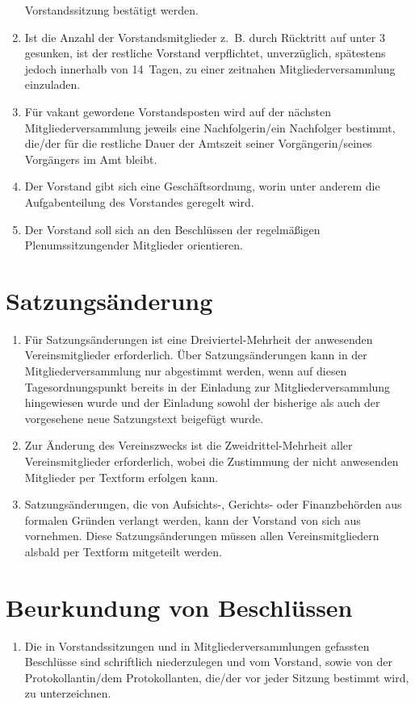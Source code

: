\documentclass[a4paper,12pt]{scrartcl}
\begin{document}
\begin{enumerate}
    Vorstandssitzung bestätigt werden. 
  \item Ist die Anzahl der Vorstandsmitglieder z.~B. durch Rücktritt auf unter 3
    gesunken, ist der restliche Vorstand verpflichtet, unverzüglich, spätestens
    jedoch innerhalb von 14~Tagen, zu einer zeitnahen Mitgliederversammlung
    einzuladen.
  \item Für vakant gewordene Vorstandsposten wird auf der nächsten
    Mitgliederversammlung jeweils eine Nachfolgerin/ein Nachfolger bestimmt, 
    die/der für die restliche Dauer der Amtszeit seiner Vorgängerin/seines
    Vorgängers im Amt bleibt.
  \item Der Vorstand gibt sich eine Geschäftsordnung, worin unter anderem die
    Aufgabenteilung des Vorstandes geregelt wird.
  \item Der Vorstand soll sich an den Beschlüssen der regelmäßigen 
    Plenumssitzungender Mitglieder orientieren.
\end{enumerate}

\section{Satzungsänderung}
\begin{enumerate}
  \item Für Satzungsänderungen ist eine Dreiviertel-Mehrheit der anwesenden
    Vereinsmitglieder erforderlich. Über Satzungsänderungen kann in der
    Mitgliederversammlung nur abgestimmt werden, wenn auf diesen
    Tagesordnungspunkt bereits in der Einladung zur Mitgliederversammlung
    hingewiesen wurde und der Einladung sowohl der bisherige als auch der
    vorgesehene neue Satzungstext beigefügt wurde.
  \item Zur Änderung des Vereinszwecks ist die Zweidrittel-Mehrheit aller
    Vereinsmitglieder erforderlich, wobei die Zustimmung der nicht anwesenden
    Mitglieder per Textform erfolgen kann.
  \item Satzungsänderungen, die von Aufsichts-, Gerichts- oder Finanzbehörden
    aus formalen Gründen verlangt werden, kann der Vorstand von sich aus
    vornehmen. Diese Satzungsänderungen müssen allen Vereinsmitgliedern
    alsbald per Textform mitgeteilt werden.
\end{enumerate}

\section{Beurkundung von Beschlüssen}
\begin{enumerate}
  \item Die in Vorstandssitzungen und in Mitgliederversammlungen gefassten
    Beschlüsse sind schriftlich niederzulegen und vom Vorstand, sowie von
    der Protokollantin/dem Protokollanten, die/der vor jeder Sitzung bestimmt 
    wird, zu unterzeichnen.
\end{enumerate}
\end{document}
